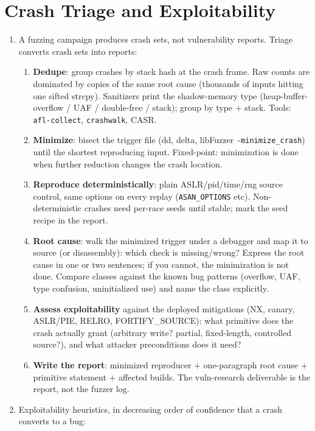 \documentclass[12pt]{Training}
\begin{document}

\section*{Crash Triage and Exploitability}
\begin{enumerate}
	\item A fuzzing campaign produces crash sets, not vulnerability reports. Triage converts crash sets into reports:
	\begin{enumerate}
		\item \textbf{Dedupe}: group crashes by stack hash at the crash frame. Raw counts are dominated by copies of the same root cause (thousands of inputs hitting one sifted strcpy). Sanitizers print the shadow-memory type (heap-buffer-overflow / UAF / double-free / stack); group by type $+$ stack. Tools: \lstinline{afl-collect}, \lstinline{crashwalk}, CASR.
		\item \textbf{Minimize}: bisect the trigger file (dd, delta, libFuzzer \lstinline{-minimize_crash}) until the shortest reproducing input. Fixed-point: minimization is done when further reduction changes the crash location.
		\item \textbf{Reproduce deterministically}: plain ASLR/pid/time/rng source control, same options on every replay (\lstinline{ASAN_OPTIONS} etc). Non-deterministic crashes need per-race seeds until stable; mark the seed recipe in the report.
		\item \textbf{Root cause}: walk the minimized trigger under a debugger and map it to source (or disassembly): which check is missing/wrong? Express the root cause in one or two sentences; if you cannot, the minimization is not done. Compare classes against the known bug patterns (overflow, UAF, type confusion, uninitialized use) and name the class explicitly.
		\item \textbf{Assess exploitability} against the deployed mitigations (NX, canary, ASLR/PIE, RELRO, FORTIFY\_SOURCE): what primitive does the crash actually grant (arbitrary write? partial, fixed-length, controlled source?), and what attacker preconditions does it need?
		\item \textbf{Write the report}: minimized reproducer $+$ one-paragraph root cause $+$ primitive statement $+$ affected builds. The vuln-research deliverable is the report, not the fuzzer log.
	\end{enumerate}
	\item Exploitability heuristics, in decreasing order of confidence that a crash converts to a bug:

\end{enumerate}
\end{document}
